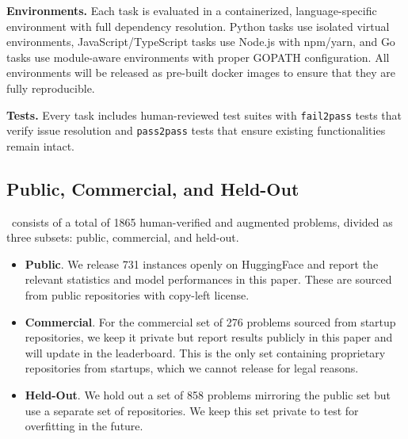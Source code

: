 
\textbf{Environments.} Each task is evaluated in a containerized, language-specific environment with full dependency resolution. Python tasks use isolated virtual environments, JavaScript/TypeScript tasks use Node.js with npm/yarn, and Go tasks use module-aware environments with proper GOPATH configuration. All environments will be released as pre-built docker images to ensure that they are fully reproducible.

\textbf{Tests.} Every task includes human-reviewed test suites with \texttt{fail2pass} tests that verify issue resolution and \texttt{pass2pass} tests that ensure existing functionalities remain intact. %

\subsection{Public, Commercial, and Held-Out \benchmarkname}

\benchmarkname~consists of a total of 1865 human-verified and augmented problems, divided as three subsets: public, commercial, and held-out.
\begin{itemize}
\item \textbf{Public}. We release 731 instances openly on HuggingFace and report the relevant statistics and model performances in this paper. These are sourced from public repositories with copy-left license. 
\item \textbf{Commercial}. For the commercial set of 276 problems sourced from startup repositories, we keep it private but report results publicly in this paper and will update in the leaderboard. This is the only set containing proprietary repositories from startups, which we cannot release for legal reasons.
\item \textbf{Held-Out}. We hold out a set of 858 problems mirroring the public set but use a separate set of repositories. We keep this set private to test for overfitting in the future.
\end{itemize}